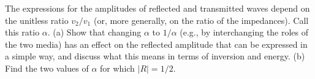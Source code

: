 The expressions for the amplitudes of reflected and transmitted waves
depend on the unitless ratio $v_2/v_1$ (or, more generally, on the ratio
of the impedances). Call this ratio $\alpha$.
(a) Show that changing $\alpha$ to $1/\alpha$ (e.g., by interchanging the
roles of the two media) has an effect on the reflected amplitude that
can be expressed in a simple way, and discuss what this means in terms
of inversion and energy.
(b) Find the two values of $\alpha$ for which $|R|=1/2$.
